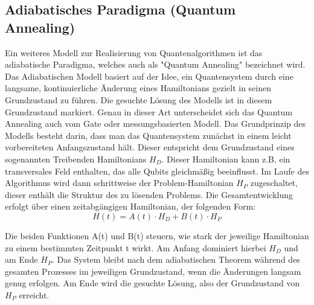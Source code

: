 \subsection{Adiabatisches Paradigma (Quantum Annealing)}
Ein weiteres Modell zur Realisierung von Quantenalgorithmen ist das adiabatische Paradigma, welches auch als "Quantum Annealing" bezeichnet wird. Das Adiabatischen Modell basiert auf der Idee, ein Quantensystem durch eine langsame, kontinuierliche Änderung eines Hamiltonians gezielt in seinen Grundzustand zu führen. Die gesuchte Lösung des Modells ist in diesem Grundzustand markiert. Genau in dieser Art unterscheidet sich das Quantum Annealing auch vom Gate oder messungsbasierten Modell. 
Das Grundprinzip des Modells besteht darin, dass man das Quantensystem zunächst in einem leicht vorbereiteten Anfangszustand hält. Dieser entspricht dem Grundzustand eines sogenannten Treibenden Hamiltonians $H_D$. Dieser Hamiltonian kann z.B. ein transversales Feld enthalten, das alle Qubits gleichmäßig beeinflusst. Im Laufe des Algorithmus wird dann schrittweise der Problem-Hamiltonian $H_P$ zugeschaltet, dieser enthält die Struktur des zu lösenden Problems. Die Gesamtentwicklung erfolgt über einen zeitabgängigen Hamiltonian, der folgenden Form:
$$
H(t) = A(t) \cdot H_D + B(t) \cdot H_P
$$

Die beiden Funktionen A(t) und B(t) steuern, wie stark der jeweilige Hamiltonian zu einem bestimmten Zeitpunkt t wirkt. Am Anfang dominiert hierbei $H_D$ und am Ende $H_P$. Das System bleibt nach dem adiabatischen Theorem während des gesamten Prozesses im jeweiligen Grundzustand, wenn die Änderungen langsam genug erfolgen. Am Ende wird die gesuchte Lösung, also der Grundzustand von $H_P$ erreicht.
 
